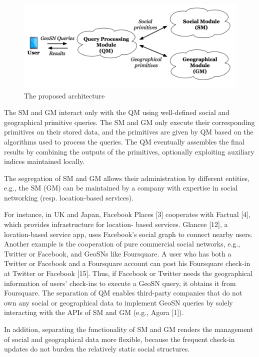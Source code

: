 \begin{figure}[hbt]
  \includegraphics[width=\linewidth]{figs/gen-arch.png}
  \caption{The proposed architecture\cite{armenatzoglou2013general}}\label{fig:gen-arch}
\end{figure}

The SM and GM interact only with the QM using well-defined social and geographical primitive queries. 
The SM and GM only execute their corresponding primitives on their stored data, and the primitives are given by QM based on the algorithms used to process the queries. 
The QM eventually assembles the final results by combining the outputs of the primitives, optionally exploiting auxiliary indices maintained locally.

The segregation of SM and GM allows their administration by different entities, e.g., the SM (GM) can be maintained by a company with expertise in social networking (resp. location-based services). 

For instance, in UK and Japan, Facebook Places [3] cooperates with Factual [4], which provides infrastructure for location- based services. Glancee [12], a location-based service app, uses Facebook’s social graph to connect nearby users. Another example is the cooperation of pure commercial social networks, e.g., Twitter or Facebook, and GeoSNs like Foursquare. A user who has both a Twitter or Facebook and a Foursquare account can post his Foursquare check-in at Twitter or Facebook [15]. Thus, if Facebook or Twitter needs the geographical information of users’ check-ins to execute a GeoSN query, it obtains it from Foursquare. The separation of QM enables third-party companies that do not own any social or geographical data to implement GeoSN queries by solely interacting with the APIs of SM and GM (e.g., Agora [1]).

In addition, separating the functionality of SM and GM renders the management of social and geographical data more flexible, because the frequent check-in updates do not burden the relatively static social structures. 

